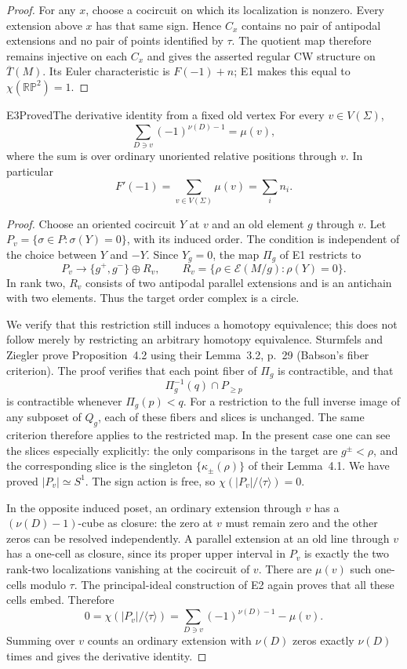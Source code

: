 \begin{proof}
For any $x$, choose a cocircuit on which its localization is nonzero. Every
extension above $x$ has that same sign. Hence $C_x$ contains no pair of
antipodal extensions and no pair of points identified by $\tau$. The quotient
map therefore remains injective on each $C_x$ and gives the asserted regular
CW structure on $\overline T(M)$. Its Euler characteristic is
$F(-1)+n$; E1 makes this equal to $\chi(\mathbb {RP}^2)=1$.
\end{proof}

\begin{resultenv}{E3}{Proved}{The derivative identity from a fixed old vertex}
For every $v\in V(\Sigma)$,
\[
 \sum_{D\ni v}(-1)^{\nu(D)-1}=\mu(v),
\]
where the sum is over ordinary unoriented relative positions through $v$.
In particular
\[
 \boxed{F'(-1)=\sum_{v\in V(\Sigma)}\mu(v)=\sum_i n_i.}
\]
\end{resultenv}
\begin{proof}
Choose an oriented cocircuit $Y$ at $v$ and an old element $g$ through $v$.
Let $P_v=\{\sigma\in P:\sigma(Y)=0\}$, with its induced order. The condition
is independent of the choice between $Y$ and $-Y$. Since $Y_g=0$, the map
$\Pi_g$ of E1 restricts to
\[
 P_v\longrightarrow\{g^+,g^-\}\oplus R_v,
 \qquad R_v=\{\rho\in\mathcal E(M/g):\rho(Y)=0\}.
\]
In rank two, $R_v$ consists of two antipodal parallel extensions and is an
antichain with two elements. Thus the target order complex is a circle.

We verify that this restriction still induces a homotopy equivalence; this
does not follow merely by restricting an arbitrary homotopy equivalence.
Sturmfels and Ziegler prove Proposition~4.2 using their Lemma~3.2, p.~29
(Babson's fiber criterion). The proof verifies that each point fiber of
$\Pi_g$ is contractible, and that
\[
 \Pi_g^{-1}(q)\cap P_{\geq p}
\]
is contractible whenever $\Pi_g(p)<q$. For a restriction to the full inverse
image of any subposet of $Q_g$, each of these fibers and slices is unchanged.
The same criterion therefore applies to the restricted map. In the present
case one can see the slices especially explicitly: the only comparisons
in the target are $g^\pm<\rho$, and the corresponding slice is the singleton
$\{\kappa_\pm(\rho)\}$ of their Lemma~4.1. We have proved $|P_v|\simeq S^1$.
The sign action is free, so $\chi(|P_v|/\langle\tau\rangle)=0$.

In the opposite induced poset, an ordinary extension through $v$ has a
$(\nu(D)-1)$-cube as closure: the zero at $v$ must remain zero and the other
zeros can be resolved independently. A parallel extension at an old line
through $v$ has a one-cell as closure, since its proper upper interval in
$P_v$ is exactly the two rank-two localizations vanishing at the cocircuit
of $v$. There are $\mu(v)$ such one-cells modulo $\tau$. The principal-ideal
construction of E2 again proves that all these cells embed. Therefore
\[
 0=\chi(|P_v|/\langle\tau\rangle)
   =\sum_{D\ni v}(-1)^{\nu(D)-1}-\mu(v).
\]
Summing over $v$ counts an ordinary extension with $\nu(D)$ zeros exactly
$\nu(D)$ times and gives the derivative identity.
\end{proof}

